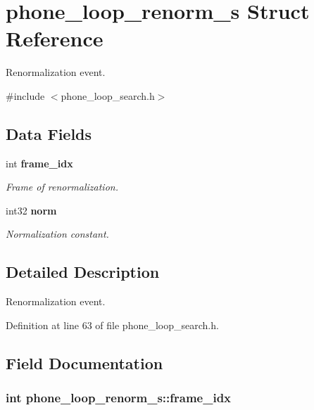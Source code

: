 \section{phone\-\_\-loop\-\_\-renorm\-\_\-s Struct Reference}
\label{structphone__loop__renorm__s}


Renormalization event.  




{\ttfamily \#include $<$phone\-\_\-loop\-\_\-search.\-h$>$}

\subsection*{Data Fields}
\begin{DoxyCompactItemize}
\item 
int {\bf frame\-\_\-idx}
\begin{DoxyCompactList}\small\item\em Frame of renormalization. \end{DoxyCompactList}\item 
int32 {\bf norm}
\begin{DoxyCompactList}\small\item\em Normalization constant. \end{DoxyCompactList}\end{DoxyCompactItemize}


\subsection{Detailed Description}
Renormalization event. 

Definition at line 63 of file phone\-\_\-loop\-\_\-search.\-h.



\subsection{Field Documentation}
\subsubsection[{frame\-\_\-idx}]{\setlength{\rightskip}{0pt plus 5cm}int phone\-\_\-loop\-\_\-renorm\-\_\-s\-::frame\-\_\-idx}\label{structphone__loop__renorm__s_af54c31c6d417b769b088b898294a135e}


